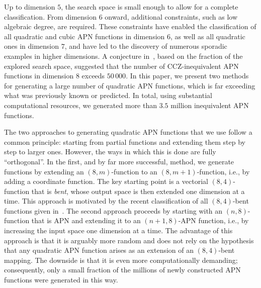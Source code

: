 \documentclass{amsart}[11pt]
\theoremstyle{plain}
\theoremstyle{definition}
\numberwithin{theorem}{section}
\numberwithin{equation}{section}
\numberwithin{table}{section}
\numberwithin{figure}{section}
\numberwithin{algorithm}{section}
\begin{document}
Up to dimension $5$, the search space is small enough to allow for a complete classification. From dimension $6$ onward, additional constraints, such as low algebraic degree, are required. These constraints have enabled the classification of all quadratic and cubic APN functions in dimension $6$, as well as all quadratic ones in dimension $7$, and have led to the discovery of numerous sporadic examples in higher dimensions. A conjecture in~\cite{YuPerrin2024}, based on the fraction of the explored search space, suggested that the number of CCZ-inequivalent APN functions in dimension $8$ exceeds $50\,000$. In this paper, we present two methods for generating a large number of quadratic APN functions, which is far exceeding what was previously known or predicted. In total, using substantial computational resources, we generated more than $3.5$ million inequivalent APN functions.


The two approaches to generating quadratic APN functions that we use follow a common principle: starting from partial functions and extending them step by step to larger ones. However, the ways in which this is done are fully ``orthogonal''.  In the first, and by far more successful, method, we generate functions by extending an $(8,m)$-function to an $(8,m+1)$-function, i.e., by adding a coordinate function. The key starting point is a vectorial $(8,4)$-function that is \emph{bent}, whose output space is then extended one dimension at a time. This approach is motivated by the recent classification of all $(8,4)$-bent functions given in~\cite{PolujanPott2022BFA}. The second approach proceeds by starting with an $(n,8)$-function that is APN and extending it to an $(n+1,8)$-APN function, i.e., by increasing the input space one dimension at a time. The advantage of this approach is that it is arguably more random and does not rely on the hypothesis that any quadratic APN function arises as an extension of an $(8,4)$-bent mapping. The downside is that it is even more computationally demanding; consequently, only a small fraction of the millions of newly constructed APN functions were generated in this way.
\end{document}
